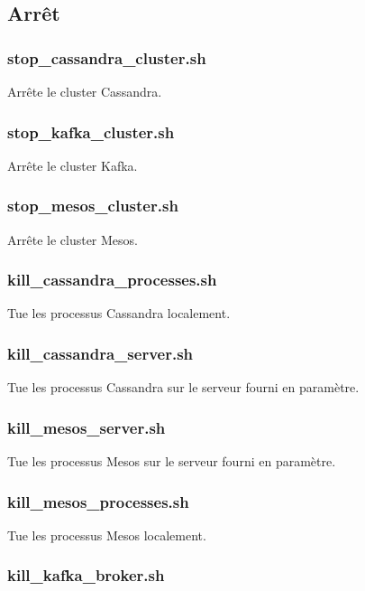 \documentclass[a4paper, 11pt, titlepage]{article}
\begin{document}
\subsection {Arrêt}

\subsubsection*{stop\_cassandra\_cluster.sh}
Arrête le cluster Cassandra.


\subsubsection*{stop\_kafka\_cluster.sh}
Arrête le cluster Kafka.


\subsubsection*{stop\_mesos\_cluster.sh}
Arrête le cluster Mesos.


\subsubsection*{kill\_cassandra\_processes.sh}

Tue les processus Cassandra localement.


\subsubsection*{kill\_cassandra\_server.sh}

Tue les processus Cassandra sur le serveur fourni en paramètre.


\subsubsection*{kill\_mesos\_server.sh}

Tue les processus Mesos sur le serveur fourni en paramètre.


\subsubsection*{kill\_mesos\_processes.sh}

Tue les processus Mesos localement.


\subsubsection*{kill\_kafka\_broker.sh}
\end{document}
